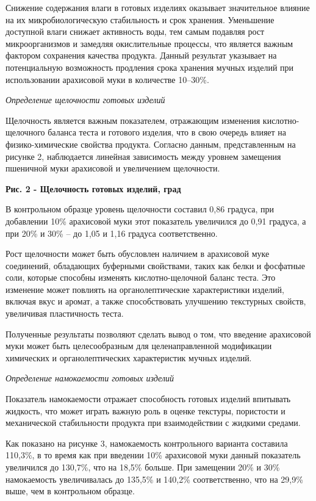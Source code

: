 Снижение содержания влаги в готовых изделиях оказывает значительное
влияние на их микробиологическую стабильность и срок хранения.
Уменьшение доступной влаги снижает активность воды, тем самым подавляя
рост микроорганизмов и замедляя окислительные процессы, что является
важным фактором сохранения качества продукта. Данный результат указывает
на потенциальную возможность продления срока хранения мучных изделий при
использовании арахисовой муки в количестве 10--30\%.

\emph{Определение щелочности готовых изделий}

Щелочность является важным показателем, отражающим изменения
кислотно-щелочного баланса теста и готового изделия, что в свою очередь
влияет на физико-химические свойства продукта. Согласно данным,
представленным на рисунке 2, наблюдается линейная зависимость между
уровнем замещения пшеничной муки арахисовой и увеличением щелочности.

{\bfseries Рис. 2 - Щелочность готовых изделий, град}

В контрольном образце уровень щелочности составил 0,86 градуса, при
добавлении 10\% арахисовой муки этот показатель увеличился до 0,91
градуса, а при 20\% и 30\% -- до 1,05 и 1,16 градуса соответственно.

Рост щелочности может быть обусловлен наличием в арахисовой муке
соединений, обладающих буферными свойствами, таких как белки и фосфатные
соли, которые способны изменять кислотно-щелочной баланс теста. Это
изменение может повлиять на органолептические характеристики изделий,
включая вкус и аромат, а также способствовать улучшению текстурных
свойств, увеличивая пластичность теста.

Полученные результаты позволяют сделать вывод о том, что введение
арахисовой муки может быть целесообразным для целенаправленной
модификации химических и органолептических характеристик мучных изделий.

\emph{Определение намокаемости готовых изделий}

Показатель намокаемости отражает способность готовых изделий впитывать
жидкость, что может играть важную роль в оценке текстуры, пористости и
механической стабильности продукта при взаимодействии с жидкими средами.

Как показано на рисунке 3, намокаемость контрольного варианта составила
110,3\%, в то время как при введении 10\% арахисовой муки данный
показатель увеличился до 130,7\%, что на 18,5\% больше. При замещении
20\% и 30\% намокаемость увеличивалась до 135,5\% и 140,2\%
соответственно, что на 29,9\% выше, чем в контрольном образце.

